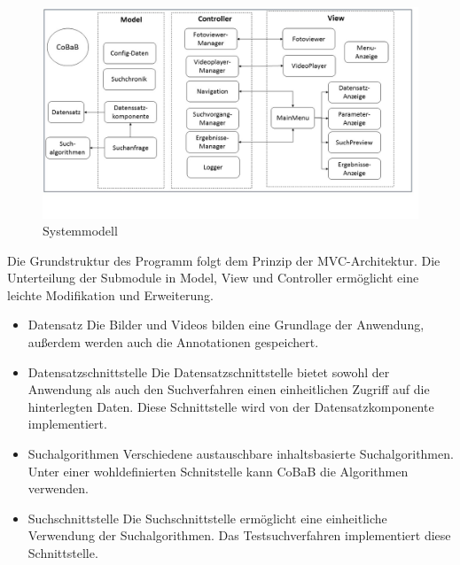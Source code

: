 \begin{figure}[h]
\includegraphics[width=1\linewidth]{img/SystemModell}
\caption{Systemmodell}
\label{fig:systemmodell}
\end{figure}
\vspace{10pt}

Die Grundstruktur des Programm folgt dem Prinzip der MVC-Architektur. Die Unterteilung der Submodule in Model, View und Controller ermöglicht eine leichte Modifikation und Erweiterung.

\begin{itemize}
\item Datensatz\newline
Die Bilder und Videos bilden eine Grundlage der Anwendung, außerdem werden auch die Annotationen gespeichert.
\item Datensatzschnittstelle\newline
Die Datensatzschnittstelle bietet sowohl der Anwendung als auch den Suchverfahren einen einheitlichen Zugriff auf die hinterlegten Daten. Diese Schnittstelle wird von der Datensatzkomponente implementiert.
\item Suchalgorithmen\newline
Verschiedene austauschbare inhaltsbasierte Suchalgorithmen. Unter einer wohldefinierten Schnitstelle kann CoBaB die Algorithmen verwenden.
\item Suchschnittstelle\newline
Die Suchschnittstelle ermöglicht eine einheitliche Verwendung der Suchalgorithmen. Das Testsuchverfahren implementiert diese Schnittstelle.
\end{itemize}

